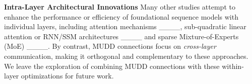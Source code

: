 \textbf{Intra-Layer Architectural Innovations}
Many other studies attempt to enhance the performance or efficiency of foundational sequence models with individual layers, including attention mechanisms ____, sub-quadratic linear attention or RNN/SSM architectures ____ and sparse Mixture-of-Experts (MoE) ____.
By contrast, MUDD connections focus on \emph{cross-layer} communication, making it orthogonal and complementary to these approaches.
We leave the exploration of combining MUDD connections with these within-layer optimizations for future work.
